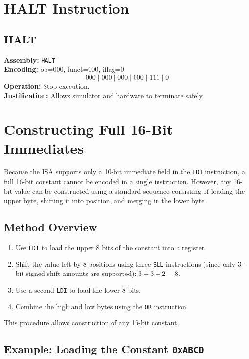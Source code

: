 \documentclass[12pt]{report}
\begin{document}
\section{HALT Instruction}

\subsection*{HALT}
\textbf{Assembly:} \texttt{HALT} \\
\textbf{Encoding:} op=000, funct=000, iflag=0 
\[
000 \;|\; 000 \;|\; 000 \;|\; 000 \;|\; 111 \;|\; 0
\]
\textbf{Operation:} Stop execution. \\
\textbf{Justification:} Allows simulator and hardware to terminate safely.

\section{Constructing Full 16-Bit Immediates}

Because the ISA supports only a 10-bit immediate field in the \texttt{LDI}
instruction, a full 16-bit constant cannot be encoded in a single instruction.
However, any 16-bit value can be constructed using a standard sequence consisting
of loading the upper byte, shifting it into position, and merging in the lower
byte.

\subsection*{Method Overview}

\begin{enumerate}
    \item Use \texttt{LDI} to load the upper 8 bits of the constant into a
          register.
    \item Shift the value left by 8 positions using three \texttt{SLL}
          instructions (since only 3-bit signed shift amounts are supported):
          \( 3 + 3 + 2 = 8 \).
    \item Use a second \texttt{LDI} to load the lower 8 bits.
    \item Combine the high and low bytes using the \texttt{OR} instruction.
\end{enumerate}

This procedure allows construction of any 16-bit constant.

\subsection*{Example: Loading the Constant \texttt{0xABCD}}
\end{document}
